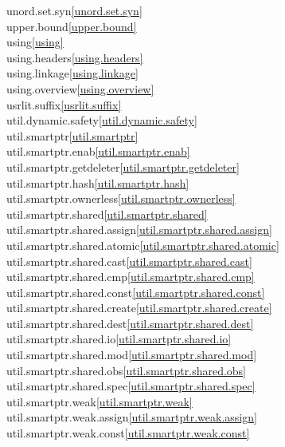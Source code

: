 \begin{multicols}{2}
unord.set.syn\quad\ref{unord.set.syn}\\
upper.bound\quad\ref{upper.bound}\\
using\quad\ref{using}\\
using.headers\quad\ref{using.headers}\\
using.linkage\quad\ref{using.linkage}\\
using.overview\quad\ref{using.overview}\\
usrlit.suffix\quad\ref{usrlit.suffix}\\
util.dynamic.safety\quad\ref{util.dynamic.safety}\\
util.smartptr\quad\ref{util.smartptr}\\
util.smartptr.enab\quad\ref{util.smartptr.enab}\\
util.smartptr.getdeleter\quad\ref{util.smartptr.getdeleter}\\
util.smartptr.hash\quad\ref{util.smartptr.hash}\\
util.smartptr.ownerless\quad\ref{util.smartptr.ownerless}\\
util.smartptr.shared\quad\ref{util.smartptr.shared}\\
util.smartptr.shared.assign\quad\ref{util.smartptr.shared.assign}\\
util.smartptr.shared.atomic\quad\ref{util.smartptr.shared.atomic}\\
util.smartptr.shared.cast\quad\ref{util.smartptr.shared.cast}\\
util.smartptr.shared.cmp\quad\ref{util.smartptr.shared.cmp}\\
util.smartptr.shared.const\quad\ref{util.smartptr.shared.const}\\
util.smartptr.shared.create\quad\ref{util.smartptr.shared.create}\\
util.smartptr.shared.dest\quad\ref{util.smartptr.shared.dest}\\
util.smartptr.shared.io\quad\ref{util.smartptr.shared.io}\\
util.smartptr.shared.mod\quad\ref{util.smartptr.shared.mod}\\
util.smartptr.shared.obs\quad\ref{util.smartptr.shared.obs}\\
util.smartptr.shared.spec\quad\ref{util.smartptr.shared.spec}\\
util.smartptr.weak\quad\ref{util.smartptr.weak}\\
util.smartptr.weak.assign\quad\ref{util.smartptr.weak.assign}\\
util.smartptr.weak.const\quad\ref{util.smartptr.weak.const}\\

\end{multicols}
